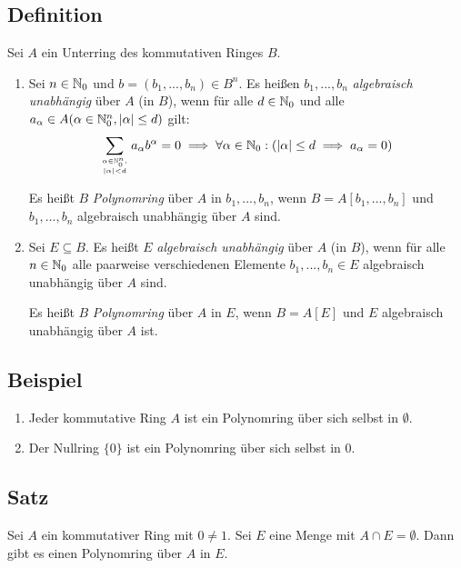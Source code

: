 \subsection{Definition} Sei $A$ ein Unterring des kommutativen Ringes $B$.
\begin{enumerate}[label=(\alph*)]
	\item
		Sei $n \in \mathbb N_0$ und $b=(b_1,...,b_n) \in B^n$. Es heißen $b_1,...,b_n$ \emph{algebraisch unabhängig} über $A$ (in $B$), wenn für alle $d \in \mathbb N_0$ und alle $a_\alpha \in A (\alpha \in \mathbb N_0^n, |\alpha|\leq d)$ gilt:
		\begin{equation*}
			\sum_{\alpha \in \mathbb N_0^n, \atop |\alpha|<d} a_\alpha b^\alpha = 0 \implies \forall\alpha\in\mathbb N_0:(|\alpha|\leq d \implies a_\alpha = 0)
		\end{equation*}
		
		Es heißt $B$ \emph{Polynomring} über $A$ in $b_1,...,b_n$, wenn $B=A[b_1,...,b_n]$ und $b_1,...,b_n$ algebraisch unabhängig über $A$ sind.
		
	\item
		Sei $E \subseteq B$. Es heißt $E$ \emph{algebraisch unabhängig}   über $A$ (in $B$), wenn für alle $n\in\mathbb N_0$ alle paarweise verschiedenen Elemente $b_1,...,b_n \in E$ algebraisch unabhängig über $A$ sind.
		
		Es heißt $B$ \emph{Polynomring} über $A$ in $E$, wenn $B=A[E]$ und $E$ algebraisch unabhängig über $A$ ist.
\end{enumerate}

\subsection{Beispiel}
\begin{enumerate}[label=(\alph*)]
	\item
		Jeder kommutative Ring $A$ ist ein Polynomring über sich selbst in $\emptyset$.
	\item
		Der Nullring $\{0\}$ ist ein Polynomring über sich selbst in $0$.
\end{enumerate}

\subsection{Satz} Sei $A$ ein kommutativer Ring mit $0\neq1$. Sei $E$ eine Menge mit $A \cap E = \emptyset$. Dann gibt es einen Polynomring über $A$ in $E$.
 
